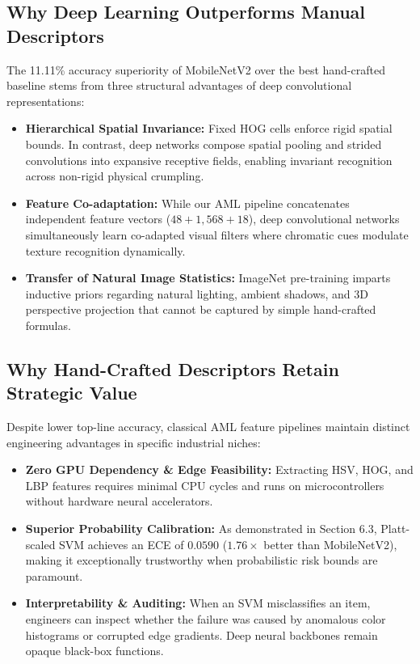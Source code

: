 \documentclass[11pt,a4paper]{article}
\begin{document}
\subsection{Why Deep Learning Outperforms Manual Descriptors}
The 11.11\% accuracy superiority of MobileNetV2 over the best hand-crafted baseline stems from three structural advantages of deep convolutional representations:
\begin{itemize}[leftmargin=*]
    \item \textbf{Hierarchical Spatial Invariance:} Fixed HOG cells enforce rigid spatial bounds. In contrast, deep networks compose spatial pooling and strided convolutions into expansive receptive fields, enabling invariant recognition across non-rigid physical crumpling.
    \item \textbf{Feature Co-adaptation:} While our AML pipeline concatenates independent feature vectors ($48 + 1,568 + 18$), deep convolutional networks simultaneously learn co-adapted visual filters where chromatic cues modulate texture recognition dynamically.
    \item \textbf{Transfer of Natural Image Statistics:} ImageNet pre-training imparts inductive priors regarding natural lighting, ambient shadows, and 3D perspective projection that cannot be captured by simple hand-crafted formulas.
\end{itemize}

\subsection{Why Hand-Crafted Descriptors Retain Strategic Value}
Despite lower top-line accuracy, classical AML feature pipelines maintain distinct engineering advantages in specific industrial niches:
\begin{itemize}[leftmargin=*]
    \item \textbf{Zero GPU Dependency \& Edge Feasibility:} Extracting HSV, HOG, and LBP features requires minimal CPU cycles and runs on microcontrollers without hardware neural accelerators.
    \item \textbf{Superior Probability Calibration:} As demonstrated in Section 6.3, Platt-scaled SVM achieves an ECE of $0.0590$ ($1.76\times$ better than MobileNetV2), making it exceptionally trustworthy when probabilistic risk bounds are paramount.
    \item \textbf{Interpretability \& Auditing:} When an SVM misclassifies an item, engineers can inspect whether the failure was caused by anomalous color histograms or corrupted edge gradients. Deep neural backbones remain opaque black-box functions.
\end{itemize}
\end{document}
